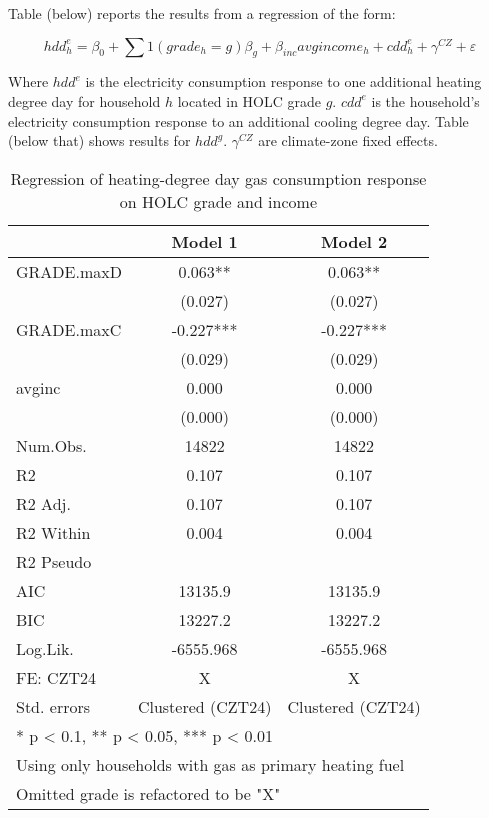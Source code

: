 \documentclass[
]{article}
\begin{document}
Table (below) reports the results from a regression of the form:

\[hdd^e_h = \beta_0 + \sum 1(grade_h=g)\beta_g + \beta_{inc} avgincome_h + cdd^e_h + \gamma^{CZ} + \varepsilon\]

Where \(hdd^e\) is the electricity consumption response to one
additional heating degree day for household \(h\) located in HOLC grade
\(g\). \(cdd^e\) is the household's electricity consumption response to
an additional cooling degree day. Table (below that) shows results for
\(hdd^g\). \(\gamma^{CZ}\) are climate-zone fixed effects.

\begin{table}

\caption{\label{tab:RASS-1ex}Regression of heating-degree day gas consumption response on HOLC grade and income\label{tab:responsegas1}}
\centering
\begin{tabular}[t]{lcc}
\toprule
  & Model 1 & Model 2\\
\midrule
GRADE.maxD & 0.063** & 0.063**\\
 & (0.027) & (0.027)\\
GRADE.maxC & -0.227*** & -0.227***\\
 & (0.029) & (0.029)\\
avginc & 0.000 & 0.000\\
 & (0.000) & (0.000)\\
\midrule
Num.Obs. & 14822 & 14822\\
R2 & 0.107 & 0.107\\
R2 Adj. & 0.107 & 0.107\\
R2 Within & 0.004 & 0.004\\
R2 Pseudo &  & \\
AIC & 13135.9 & 13135.9\\
BIC & 13227.2 & 13227.2\\
Log.Lik. & -6555.968 & -6555.968\\
FE: CZT24 & X & X\\
Std. errors & Clustered (CZT24) & Clustered (CZT24)\\
\bottomrule
\multicolumn{3}{l}{\textsuperscript{} * p < 0.1, ** p < 0.05, *** p < 0.01}\\
\multicolumn{3}{l}{\textsuperscript{} Using only households with gas as primary heating fuel}\\
\multicolumn{3}{l}{\textsuperscript{} Omitted grade is refactored to be "X"}\\
\end{tabular}
\end{table}
\end{document}
